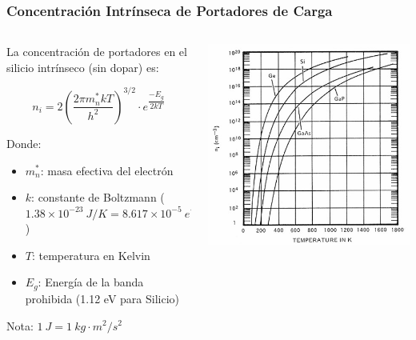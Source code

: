 \documentclass[10pt,t,aspectratio=169]{beamer}
\begin{document}
\begin{frame}[t]
  \frametitle{Concentración Intrínseca de Portadores de Carga}

  \begin{columns}
  
    \begin{column}[]{0.55\textwidth}
    
      La concentración de portadores en el silicio intrínseco (sin dopar) es:

      \[ n_i = 2 \left( \dfrac{2\pi{}m_n^* k T}{h^2} \right)^{3/2} \cdot{} e^{\dfrac{-E_g}{2kT}}\]

      Donde:

      \begin{itemize}
        \item $m_n^*$: masa efectiva del electrón
        \item $k$: constante de Boltzmann ($1.38\times{}10^{-23}\ J/K = 8.617\times{}10^{-5}\ eV/K$)
        \item $T$: temperatura en Kelvin
        \item $E_g$: Energía de la banda prohibida (1.12 eV para Silicio)
      \end{itemize}
      
      Nota: $1\ J = 1\ kg\cdot{}m^2/s^2$

    \end{column}
    
    \begin{column}[]{0.45\textwidth}
    
      \includegraphics[width=\textwidth]{./figures/intrinsic-carrier-concentration.jpg}
      
    \end{column}
    
  \end{columns}
  
\end{frame}
\end{document}
